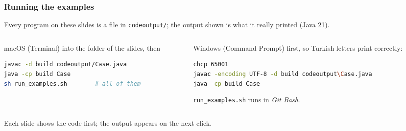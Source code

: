 \documentclass[aspectratio=169,10pt,compress]{beamer}
\begin{document}
\begin{frame}[t,fragile] \frametitle{Running the examples}
  \small Every program on these slides is a file in \texttt{codeoutput/}; the output shown is what it really printed (Java 21).
  \begin{columns}[T]
    \begin{column}{0.48\textwidth}
      \begin{block}{macOS (Terminal)}
        \footnotesize
         into the folder of the slides, then


\begin{lstlisting}[style=codesnippet, language=bash]
javac -d build codeoutput/Case.java
java -cp build Case
sh run_examples.sh        # all of them
\end{lstlisting}



      \end{block}
    \end{column}
    \begin{column}{0.48\textwidth}
      \begin{block}{Windows (Command Prompt)}
        \footnotesize
         first, so Turkish letters print correctly:


\begin{lstlisting}[style=codesnippet, language=bash]
chcp 65001
javac -encoding UTF-8 -d build codeoutput\Case.java
java -cp build Case
\end{lstlisting}



        \texttt{run\_examples.sh} runs in \emph{Git Bash}.
      \end{block}
    \end{column}
  \end{columns}
  \vspace{0.3em}
  \small Each slide shows the code first; the output appears on the next click. 
\end{frame}


\end{document}
